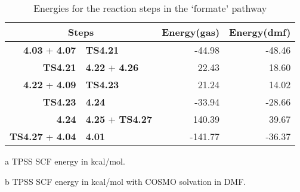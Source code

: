 \begin{table}[!htb]
\centering
 \begin{threeparttable}
  \caption{Energies for the reaction steps in the `formate' pathway}
    \begin{tabular}{r@{ $\rightarrow$ }lrr}
    \toprule
    \multicolumn{2}{c}{Steps} & Energy(gas)\tnote{a} & Energy(dmf)\tnote{b} \\
    \midrule
    \textbf{4.03} + \textbf{4.07} & \textbf{TS4.21} & -44.98 & -48.46 \\
    \textbf{TS4.21} & \textbf{4.22} + \textbf{4.26} & 22.43 & 18.60 \\
    \textbf{4.22} + \textbf{4.09} & \textbf{TS4.23} & 21.24 & 14.02 \\
    \textbf{TS4.23} & \textbf{4.24} & -33.94 & -28.66 \\
    \textbf{4.24} & \textbf{4.25} + \textbf{TS4.27} & 140.39 & 39.67 \\
    \textbf{TS4.27} + \textbf{4.04} & \textbf{4.01} & -141.77 & -36.37 \\
    \bottomrule
    \end{tabular}%
    \begin{tablenotes}
    \item [a] TPSS SCF energy in kcal/mol.
    \item [b] TPSS SCF energy in kcal/mol with COSMO solvation in DMF.
    \end{tablenotes}
  \label{tab.formrxn}%
 \end{threeparttable}
\end{table}%

